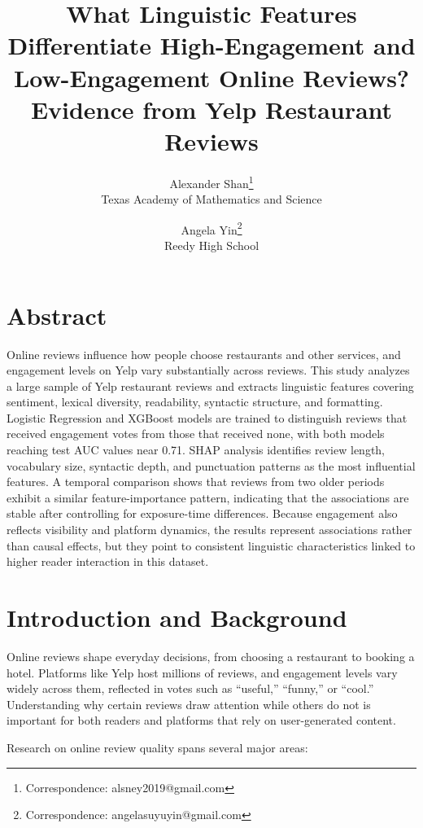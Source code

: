 \documentclass[12pt]{article}
\title{What Linguistic Features Differentiate High-Engagement and Low-Engagement Online Reviews? Evidence from Yelp Restaurant Reviews}
\author{
Alexander Shan\thanks{Correspondence: alsney2019@gmail.com}\\
Texas Academy of Mathematics and Science
\and
Angela Yin\thanks{Correspondence: angelasuyuyin@gmail.com}\\
Reedy High School
}
\begin{document}
\maketitle

\fontsize{12pt}{12pt}\selectfont

\section*{Abstract}

Online reviews influence how people choose restaurants and other services, and engagement levels on Yelp vary substantially across reviews. 
This study analyzes a large sample of Yelp restaurant reviews and extracts linguistic features covering sentiment, lexical diversity, readability, syntactic structure, 
and formatting. Logistic Regression and XGBoost models are trained to distinguish reviews that received engagement votes from those that received none, 
with both models reaching test AUC values near 0.71. SHAP analysis identifies review length, vocabulary size, syntactic depth, and punctuation patterns as the most influential features. A temporal comparison shows that reviews from two older periods exhibit a similar feature-importance pattern, indicating that the associations are stable after controlling for exposure-time differences. Because engagement also reflects visibility and platform dynamics, the results represent associations rather than causal effects, 
but they point to consistent linguistic characteristics linked to higher reader interaction in this dataset.

\section{Introduction and Background}

Online reviews shape everyday decisions, from choosing a restaurant to booking a hotel. 
Platforms like Yelp host millions of reviews, and engagement levels vary widely across them, reflected in votes such as “useful,” “funny,” 
or “cool.” Understanding why certain reviews draw attention while others do not is important for both readers and platforms that rely on 
user-generated content.
 
Research on online review quality spans several major areas:
\end{document}
